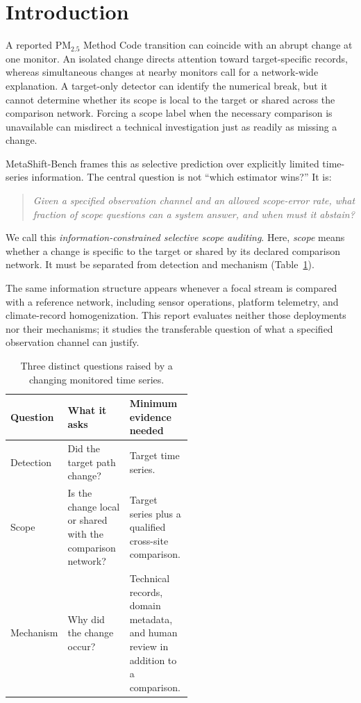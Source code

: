 \section{Introduction}

A reported PM$_{2.5}$ Method Code transition can coincide with an abrupt change
at one monitor. An isolated change directs attention toward target-specific
records, whereas simultaneous changes at nearby monitors call for a
network-wide explanation. A target-only detector can identify the numerical
break, but it cannot determine whether its scope is local to the target or
shared across the comparison network. Forcing a scope label when the necessary
comparison is unavailable can misdirect a technical investigation just as
readily as missing a change.

MetaShift-Bench frames this as selective prediction over explicitly limited
time-series information. The central question is not ``which estimator wins?''
It is:
\begin{quote}
\emph{Given a specified observation channel and an allowed scope-error rate,
what fraction of scope questions can a system answer, and when must it abstain?}
\end{quote}

We call this \emph{information-constrained selective scope auditing}. Here,
\emph{scope} means whether a change is specific to the target or shared by its
declared comparison network. It must be separated from detection and mechanism
(Table~\ref{tab:three-questions}).

The same information structure appears whenever a focal stream is compared with
a reference network, including sensor operations, platform telemetry, and
climate-record homogenization. This report evaluates neither those deployments
nor their mechanisms; it studies the transferable question of what a specified
observation channel can justify.

\begin{table}[!ht]
\centering
\caption{Three distinct questions raised by a changing monitored time series.}
\label{tab:three-questions}
\small
\begin{tabularx}{\linewidth}{@{}p{0.18\linewidth}p{0.34\linewidth}X@{}}
\toprule
Question & What it asks & Minimum evidence needed \\
\midrule
Detection & Did the target path change? & Target time series. \\
Scope & Is the change local or shared with the comparison network? & Target
series plus a qualified cross-site comparison. \\
Mechanism & Why did the change occur? & Technical records, domain metadata, and
human review in addition to a comparison. \\
\bottomrule
\end{tabularx}
\end{table}

